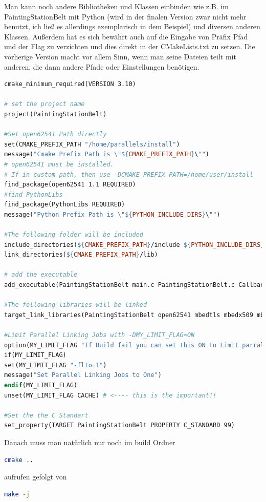 Man kann noch andere Bibliotheken und Klassen einbinden wie z.B. im PaintingStationBelt mit Python (wird in der finalen Version zwar nicht mehr benutzt, ich ließ es allerdings exemplarisch in dem Beispiel) und diversen anderen Klassen. Außerdem hat es sich bewährt auch auf die Eingabe von Präfix Pfad und der Flag zu verzichten und dies direkt in der CMakeLists.txt zu setzen. Die vorherige Version macht vor allem Sinn, wenn man seine Dateien teilt mit anderen, die dann andere Pfade oder Einstellungen benötigen.
\begin{lstlisting}[language=make]
cmake_minimum_required(VERSION 3.10)

# set the project name
project(PaintingStationBelt)

#Set open62541 Path directly
set(CMAKE_PREFIX_PATH "/home/parallels/install")
message("Cmake Prefix Path is \"${CMAKE_PREFIX_PATH}\"")
# open62541 must be installed.
# If in custom path, then use -DCMAKE_PREFIX_PATH=/home/user/install
find_package(open62541 1.1 REQUIRED)
#find PythonLibs
find_package(PythonLibs REQUIRED)
message("Python Prefix Path is \"${PYTHON_INCLUDE_DIRS}\"")

#The following folder will be included
include_directories(${CMAKE_PREFIX_PATH}/include ${PYTHON_INCLUDE_DIRS} PyhtonScripts)
link_directories(${CMAKE_PREFIX_PATH}/lib)

# add the executable
add_executable(PaintingStationBelt main.c PaintingStationBelt.c Callbacks.c OpcUaHelper.c KpiCalculator.c)

#The following libraries will be linked
target_link_libraries(PaintingStationBelt open62541 mbedtls mbedx509 mbedcrypto pthread ${PYTHON_LIBRARIES})

#Limit Parallel Linking Jobs with -DMY_LIMIT_FLAG=ON
option(MY_LIMIT_FLAG "If Build fail you can set this ON to Limit parralel Linking Jobs to One" OFF) #OFF by default
if(MY_LIMIT_FLAG)
set(MY_LIMIT_FLAG "-flto=1")
message("Set Parallel Linking Jobs to One")
endif(MY_LIMIT_FLAG)
unset(MY_LIMIT_FLAG CACHE) # <---- this is the important!!

#Set the the C Standart
set_property(TARGET PaintingStationBelt PROPERTY C_STANDARD 99)
\end{lstlisting}
Danach muss man natürlich nur noch im build Ordner 
\begin{lstlisting}[language=Bash]
cmake .. 
\end{lstlisting}

aufrufen gefolgt von 
\begin{lstlisting}[language=Bash]
make -j
\end{lstlisting}

